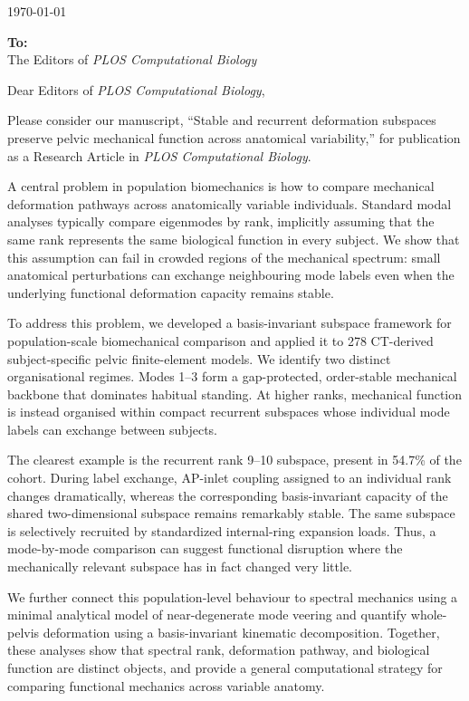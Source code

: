 \documentclass[10pt,a4paper]{article}
\begin{document}
\begin{flushright}
    \today
\end{flushright}

\vspace{-0.5em}

\textbf{To:} \\
The Editors of \textit{PLOS Computational Biology}

\vspace{0.4em}

Dear Editors of \textit{PLOS Computational Biology},

Please consider our manuscript, ``Stable and recurrent deformation subspaces preserve pelvic mechanical function across anatomical variability,'' for publication as a Research Article in \textit{PLOS Computational Biology}.

A central problem in population biomechanics is how to compare mechanical deformation pathways across anatomically variable individuals. Standard modal analyses typically compare eigenmodes by rank, implicitly assuming that the same rank represents the same biological function in every subject. We show that this assumption can fail in crowded regions of the mechanical spectrum: small anatomical perturbations can exchange neighbouring mode labels even when the underlying functional deformation capacity remains stable.

To address this problem, we developed a basis-invariant subspace framework for population-scale biomechanical comparison and applied it to 278 CT-derived subject-specific pelvic finite-element models. We identify two distinct organisational regimes. Modes 1--3 form a gap-protected, order-stable mechanical backbone that dominates habitual standing. At higher ranks, mechanical function is instead organised within compact recurrent subspaces whose individual mode labels can exchange between subjects.

The clearest example is the recurrent rank 9--10 subspace, present in 54.7\% of the cohort. During label exchange, AP-inlet coupling assigned to an individual rank changes dramatically, whereas the corresponding basis-invariant capacity of the shared two-dimensional subspace remains remarkably stable. The same subspace is selectively recruited by standardized internal-ring expansion loads. Thus, a mode-by-mode comparison can suggest functional disruption where the mechanically relevant subspace has in fact changed very little.

We further connect this population-level behaviour to spectral mechanics using a minimal analytical model of near-degenerate mode veering and quantify whole-pelvis deformation using a basis-invariant kinematic decomposition. Together, these analyses show that spectral rank, deformation pathway, and biological function are distinct objects, and provide a general computational strategy for comparing functional mechanics across variable anatomy.
\end{document}

